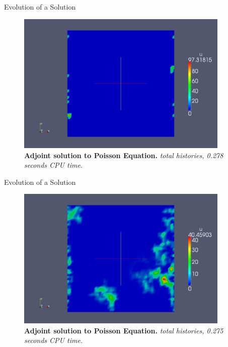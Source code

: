 \documentclass{beamer}
\begin{document}
\begin{frame}{Evolution of a Solution}

  \begin{figure}[h!]
    \begin{center}
      \includegraphics[width=4in]{adjoint_10.png}
    \end{center}
    \caption{\textbf{Adjoint solution to Poisson Equation.}
      \textit{ total histories, 0.278 seconds CPU time.} }
  \end{figure}

\end{frame}

\begin{frame}{Evolution of a Solution}

  \begin{figure}[h!]
    \begin{center}
      \includegraphics[width=4in]{adjoint_100.png}
    \end{center}
    \caption{\textbf{Adjoint solution to Poisson Equation.}
      \textit{ total histories, 0.275 seconds CPU time.} }
  \end{figure}

\end{frame}
\end{document}
